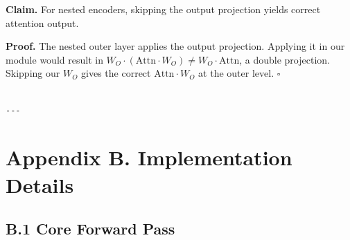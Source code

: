 \textbf{Claim.} For nested encoders, skipping the output projection yields correct 
attention output.

\textbf{Proof.} The nested outer layer applies the output projection. Applying it 
in our module would result in $W_O \cdot (\text{Attn} \cdot W_O) \neq W_O \cdot \text{Attn}$, 
a double projection. Skipping our $W_O$ gives the correct 
$\text{Attn} \cdot W_O$ at the outer level. $\square$
\begin{lstlisting}

---
\end{lstlisting}

\section{Appendix B. Implementation Details}

\subsection{B.1 Core Forward Pass}

